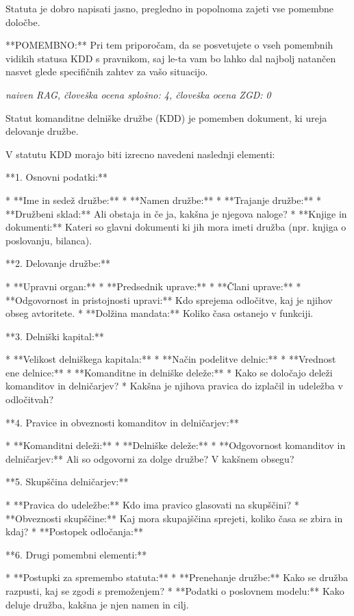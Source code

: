 \documentclass[a4paper,12pt,openright]{book}
\begin{document}
Statuta je dobro napisati jasno, pregledno in popolnoma zajeti vse pomembne določbe.

**POMEMBNO:** Pri tem priporočam, da se posvetujete o vseh pomembnih vidikih statusa KDD s pravnikom, saj le-ta vam bo lahko dal najbolj natančen nasvet glede specifičnih zahtev za vašo situacijo.

\vspace{0.5cm}
\textit{naiven RAG, človeška ocena splošno: 4, človeška ocena ZGD: 0}

Statut komanditne delniške družbe (KDD) je pomemben dokument, ki ureja delovanje družbe.

V statutu KDD morajo biti izrecno navedeni naslednji elementi:

**1. Osnovni podatki:**

* **Ime in sedež družbe:**
* **Namen družbe:**
* **Trajanje družbe:**
* **Družbeni sklad:** Ali obstaja in če ja, kakšna je njegova naloge?
* **Knjige in dokumenti:** Kateri so glavni dokumenti ki jih mora imeti družba (npr. knjiga o poslovanju, bilanca).

**2. Delovanje družbe:**

* **Upravni organ:**
    * **Predsednik uprave:**
    * **Člani uprave:**
    * **Odgovornost in pristojnosti upravi:** Kdo sprejema odločitve, kaj je njihov obseg avtoritete.
    * **Dolžina mandata:** Koliko časa ostanejo v funkciji.

**3. Delniški kapital:**

* **Velikost delniškega kapitala:**
* **Način podelitve delnic:**
* **Vrednost ene delnice:**
* **Komanditne in delniške deleže:**
    * Kako se določajo deleži komanditov in delničarjev?
    * Kakšna je njihova pravica do izplačil in udeležba v odločitvah?

**4. Pravice in obveznosti komanditov in delničarjev:**

* **Komanditni deleži:**
* **Delniške deleže:**
* **Odgovornost komanditov in delničarjev:** Ali so odgovorni za dolge družbe? V kakšnem obsegu?


**5. Skupščina delničarjev:**

* **Pravica do udeležbe:** Kdo ima pravico glasovati na skupščini?
* **Obveznosti skupščine:** Kaj mora skupajščina sprejeti, koliko časa se zbira in kdaj?
* **Postopek odločanja:**

**6. Drugi pomembni elementi:**

* **Postupki za spremembo statuta:**
* **Prenehanje družbe:** Kako se družba razpusti, kaj se zgodi s premoženjem?
* **Podatki o poslovnem modelu:**  Kako deluje družba, kakšna je njen namen in cilj.
\end{document}
